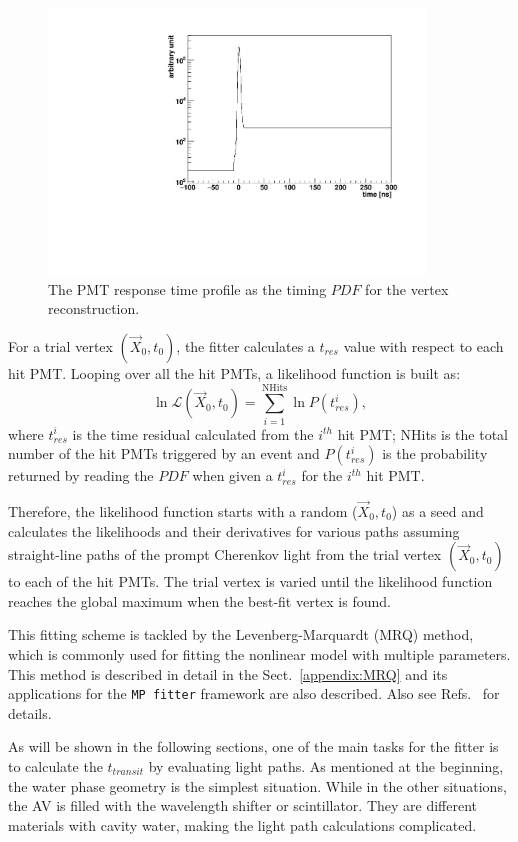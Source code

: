 \begin{figure}[!htb]
	\centering
	\includegraphics[width=10cm]{MPW_timingPDF.pdf}
	\caption{The PMT response time profile as the timing $PDF$ for the vertex reconstruction.}
	\label{fig:MPW_timingPDF}
\end{figure}

For a trial vertex $(\vec{X}_0,t_0)$, the fitter calculates a $t_{res}$ value with respect to each hit PMT. Looping over all the hit PMTs, a likelihood function is built as:
\begin{equation}\label{eq:vertexLogL}
\ln\mathcal{L}(\vec{X}_0,t_0)=\sum_{i=1}^{{\mathrm{NHits}}}\ln P(t^i_{res}),
\end{equation}
where $t^i_{res}$ is the time residual calculated from the $i^{th}$ hit PMT; NHits is the total number of the hit PMTs triggered by an event and $P(t^i_{res})$ is the probability returned by reading the $PDF$ when given a $t^i_{res}$ for the $i^{th}$ hit PMT.

Therefore, the likelihood function starts with a random ($\vec{X}_0,t_0$) as a seed and calculates the likelihoods and their derivatives for various paths assuming straight-line paths of the prompt Cherenkov light from the trial vertex $(\vec{X}_0,t_0)$ to each of the hit PMTs. The trial vertex is varied until the likelihood function reaches the global maximum when the best-fit vertex is found.

This fitting scheme is tackled by the Levenberg-Marquardt (MRQ) method, which is commonly used for fitting the nonlinear model with multiple parameters. This method is described in detail in the Sect.~\ref{appendix:MRQ} and its applications for the \texttt{MP fitter} framework are also described. Also see Refs.~\cite{gregory2005bayesian, press2007numerical} for details.

As will be shown in the following sections, one of the main tasks for the fitter is to calculate the $t_{transit}$ by evaluating light paths.  As mentioned at the beginning, the water phase geometry is the simplest situation. While in the other situations, the AV is filled with the wavelength shifter or scintillator. They are different materials with cavity water, making the light path calculations complicated.

